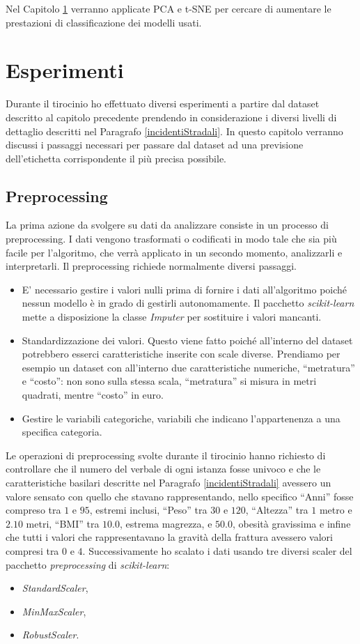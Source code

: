 \documentclass[12pt,italian]{report}
\begin{document}
Nel Capitolo \ref{Esperimenti} verranno applicate PCA e t-SNE per cercare di aumentare le prestazioni di classificazione dei modelli usati.



% 
% 

\chapter{Esperimenti}
\label{Esperimenti}
Durante il tirocinio ho effettuato diversi esperimenti a partire dal dataset descritto al capitolo precedente prendendo in considerazione i diversi livelli di dettaglio descritti nel Paragrafo \ref{incidentiStradali}.
In questo capitolo verranno discussi i passaggi necessari per passare dal dataset ad una previsione dell'etichetta corrispondente il più precisa possibile.
\section{Preprocessing}
\label{preprocessing}
La prima azione da svolgere su dati da analizzare consiste in un processo di preprocessing. I dati vengono trasformati o codificati in modo tale che sia più facile per l'algoritmo, che verrà applicato in un secondo momento,  analizzarli e interpretarli.
Il preprocessing richiede normalmente diversi passaggi.
\begin{itemize}
	\item E' necessario gestire i valori nulli prima di fornire i dati all'algoritmo poiché nessun modello è in grado di gestirli autonomamente. Il pacchetto \emph{scikit-learn} mette a disposizione la classe \emph{Imputer} per sostituire i valori mancanti.
	\item Standardizzazione dei valori. Questo viene fatto poiché all'interno del dataset potrebbero esserci caratteristiche inserite con scale diverse. Prendiamo per esempio un dataset con all'interno due caratteristiche numeriche, ``metratura'' e ``costo'': non sono sulla stessa scala, ``metratura'' si misura in metri quadrati, mentre ``costo'' in euro. 
	\item Gestire le variabili categoriche, variabili che indicano l'appartenenza a una specifica categoria.
\end{itemize}
Le operazioni di preprocessing svolte durante il tirocinio hanno richiesto di controllare che il numero del verbale di ogni istanza fosse univoco e che le caratteristiche basilari descritte nel Paragrafo \ref{incidentiStradali} avessero un valore sensato con quello che stavano rappresentando, nello specifico ``Anni'' fosse compreso tra $1$ e $95$, estremi inclusi, ``Peso'' tra $30$ e $120$, ``Altezza'' tra $1$ metro e $2.10$ metri, ``BMI'' tra $10.0$, estrema magrezza, e $50.0$, obesità gravissima e infine che tutti i valori che rappresentavano la gravità della frattura avessero valori compresi tra $0$ e $4$.  Successivamente ho scalato i dati usando tre diversi scaler del pacchetto \emph{preprocessing} di \emph{scikit-learn}:
\begin{itemize}
	\item \emph{StandardScaler},
	\item \emph{MinMaxScaler},
	\item \emph{RobustScaler}.
\end{itemize} 
\end{document}
